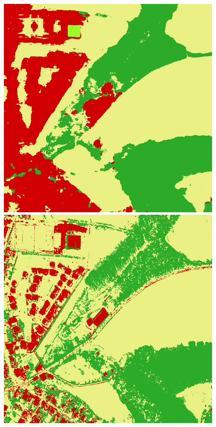 \begin{figure}
    \includegraphics[width=\DiscussionImageWidth]{images/segmentation_discussion/unet/2.png} \hfill
    \includegraphics[width=\DiscussionImageWidth]{images/segmentation_discussion/densenet/2.png}


\end{figure}
